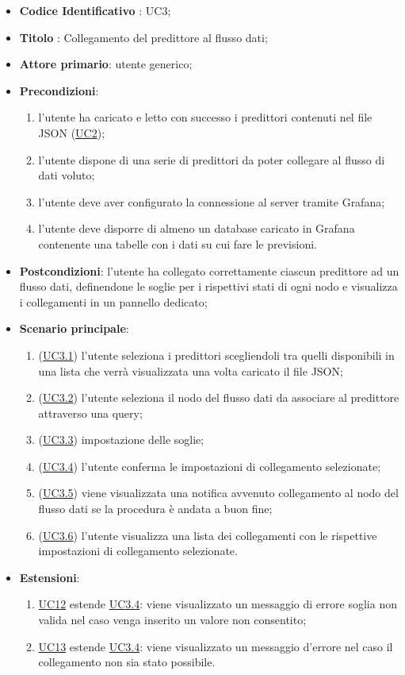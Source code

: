 		\begin{itemize}
			\item\textbf{Codice Identificativo} : UC3;
			\item\textbf{Titolo} : Collegamento del predittore al flusso dati;
			\item\textbf{Attore primario}: utente generico;
			\item\textbf{Precondizioni}:
				\begin{enumerate}
					\item l'utente ha caricato e letto con successo i predittori contenuti nel file JSON (\hyperref[par:UC2]{UC2});
					\item l'utente dispone di una serie di predittori da poter collegare al flusso di dati voluto;
					\item l’utente deve aver configurato la connessione al server tramite Grafana;
					\item l’utente deve disporre di almeno un database caricato in Grafana contenente una tabelle con i dati su cui fare le previsioni.

					
				\end{enumerate}
			\item\textbf{Postcondizioni}: l'utente ha collegato correttamente ciascun predittore ad un flusso dati, definendone le soglie per i rispettivi stati di ogni nodo e visualizza i collegamenti in un pannello dedicato;
			\item\textbf{Scenario principale}:
				\begin{enumerate}
					\item (\hyperref[par:UC3.1]{UC3.1}) l'utente seleziona i predittori scegliendoli tra quelli disponibili in una lista che verrà visualizzata una volta caricato il file JSON;
					\item (\hyperref[par:UC3.2]{UC3.2}) l'utente seleziona il nodo del flusso dati da associare al predittore attraverso una query\glo;
					\item (\hyperref[par:UC3.3]{UC3.3}) impostazione delle soglie;
					\item (\hyperref[par:UC3.4]{UC3.4}) l'utente conferma le impostazioni di collegamento selezionate;	
					\item (\hyperref[par:UC3.5]{UC3.5}) viene visualizzata una notifica avvenuto collegamento al nodo del flusso dati se la procedura è andata a buon fine;
					\item (\hyperref[par:UC3.6]{UC3.6}) l'utente visualizza una lista dei collegamenti con le rispettive impostazioni di collegamento selezionate.
				\end{enumerate}
			\item\textbf{Estensioni}:
				\begin{enumerate}
					\item\hyperref[par:UC12]{UC12} estende \hyperref[par:UC3.4]{UC3.4}: viene visualizzato un messaggio di errore soglia non valida nel caso venga inserito un valore non consentito;
					\item\hyperref[par:UC13]{UC13} estende \hyperref[par:UC3.4]{UC3.4}: viene visualizzato un messaggio d'errore nel caso il collegamento non sia stato possibile.
						

\end{enumerate}
\end{itemize}

